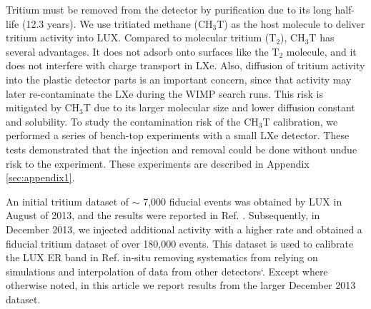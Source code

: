 Tritium must be removed from the detector by purification due to its long half-life (12.3 years\cite{Tritium_halflife_all}). We use tritiated methane (CH$_3$T) as the host molecule to deliver tritium activity into LUX. Compared to molecular tritium (T$_2$), CH$_3$T has several advantages. It does not adsorb onto surfaces like the T$_2$ molecule, and it does not interfere with charge transport in LXe. Also, diffusion of tritium activity into the plastic detector parts is an important concern, since that activity may later re-contaminate the LXe during the WIMP search runs.  This risk is mitigated by CH$_3$T due to its larger molecular size and lower diffusion constant and solubility. To study the contamination risk of the CH$_3$T calibration, we performed a series of bench-top experiments with a small LXe detector. These tests demonstrated that the injection and removal could be done without undue risk to the experiment. These experiments are described in Appendix \ref{sec:appendix1}.

An initial tritium dataset of $\sim$ 7,000 fiducial events was obtained by LUX in August of 2013, and the results were reported in Ref. \cite{lux-prl}. Subsequently, in December 2013, we injected additional activity with a higher rate and obtained a fiducial tritium dataset of over 180,000 events. This dataset is used to calibrate the LUX ER band in Ref. \cite{lux-reanalysis} in-situ removing systematics from relying on simulations and interpolation of data from other detectors`. Except where otherwise noted, in this article we report results from the larger December 2013 dataset.